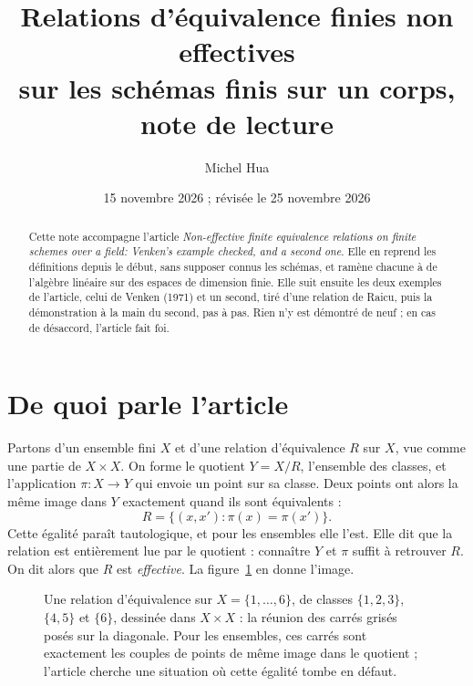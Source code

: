 \documentclass[11pt,a4paper]{amsart}
\title[Note de lecture : relations d'équivalence finies non effectives]{Relations d'équivalence finies non effectives\\ sur les schémas finis sur un corps,\\ note de lecture}
\author{Michel Hua}
\date{15 novembre 2026 ; révisée le 25 novembre 2026}
\theoremstyle{definition}
\theoremstyle{plain}
\theoremstyle{remark}
\begin{document}
\maketitle

\begin{abstract}
Cette note accompagne l'article \emph{Non-effective finite equivalence relations on finite schemes over a field: Venken's example checked, and a second one}. Elle en reprend les définitions depuis le début, sans supposer connus les schémas, et ramène chacune à de l'algèbre linéaire sur des espaces de dimension finie. Elle suit ensuite les deux exemples de l'article, celui de Venken (1971) et un second, tiré d'une relation de Raicu, puis la démonstration à la main du second, pas à pas. Rien n'y est démontré de neuf ; en cas de désaccord, l'article fait foi.
\end{abstract}

\section{De quoi parle l'article}

Partons d'un ensemble fini $X$ et d'une relation d'équivalence $R$ sur $X$, vue comme une partie de $X \times X$. On forme le quotient $Y = X/R$, l'ensemble des classes, et l'application $\pi : X \to Y$ qui envoie un point sur sa classe. Deux points ont alors la même image dans $Y$ exactement quand ils sont équivalents :
\[
R = \{(x, x') : \pi(x) = \pi(x')\}.
\]
Cette égalité paraît tautologique, et pour les ensembles elle l'est. Elle dit que la relation est entièrement lue par le quotient : connaître $Y$ et $\pi$ suffit à retrouver $R$. On dit alors que $R$ est \emph{effective}. La figure~\ref{fig:ensembles} en donne l'image.

\begin{figure}[htbp]
\centering
{}
\caption{Une relation d'équivalence sur $X = \{1, \dots, 6\}$, de classes $\{1,2,3\}$, $\{4,5\}$ et $\{6\}$, dessinée dans $X \times X$ : la réunion des carrés grisés posés sur la diagonale. Pour les ensembles, ces carrés sont exactement les couples de points de même image dans le quotient ; l'article cherche une situation où cette égalité tombe en défaut.}\label{fig:ensembles}
\end{figure}
\end{document}
